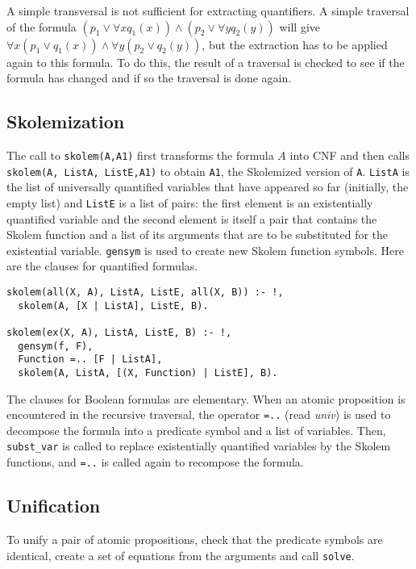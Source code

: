 \documentclass[11pt]{article}
\newcommand*{\p}[1]{\textup{\texttt{#1}}}
\begin{document}
A simple transversal is not sufficient for extracting quantifiers. A
simple traversal of the formula $(p_{1} \vee \forall xq_{1}(x)) \wedge
(p_{2} \vee \forall yq_{2}(y))$ will give $\forall x(p_{1} \vee
q_{1}(x)) \wedge \forall y(p_{2} \vee q_{2}(y))$, but the extraction has
to be applied again to this formula. To do this, the result of a
traversal is checked to see if the formula has changed and if so the
traversal is done again.




\subsection{Skolemization}\label{s.skolem}

The call to \p{skolem(A,A1)} first transforms the formula $A$ into CNF
and then calls \p{skolem(A, ListA, ListE,A1)} to obtain \p{A1}, the
Skolemized version of \p{A}. \p{ListA} is the list of universally
quantified variables that have appeared so far (initially, the empty
list) and \p{ListE} is a list of pairs: the first element is an
existentially quantified variable and the second element is itself a
pair that contains the Skolem function and a list of its arguments that
are to be substituted for the existential variable. \p{gensym} is used
to create new Skolem function symbols. Here are the clauses for
quantified formulas.

\begin{verbatim}
skolem(all(X, A), ListA, ListE, all(X, B)) :- !,
  skolem(A, [X | ListA], ListE, B).

skolem(ex(X, A), ListA, ListE, B) :- !,
  gensym(f, F),
  Function =.. [F | ListA],    
  skolem(A, ListA, [(X, Function) | ListE], B).
\end{verbatim}

The clauses for Boolean formulas are elementary. When an atomic
proposition is encountered in the recursive traversal,
the operator \p{=..} (read \emph{univ}) is used to decompose the formula
into a predicate symbol and a list of variables. Then, \p{subst\_var} is
called to replace existentially quantified variables by the Skolem
functions, and \p{=..} is called again to recompose the formula.




\subsection{Unification}\label{s.unif}

To unify a pair of atomic propositions, check that the predicate
symbols are identical, create a set of equations from the arguments and
call \p{solve}.
\end{document}
